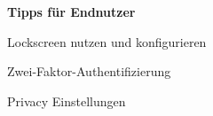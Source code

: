 \begin{frame}
	\centering
	\textbf{Tipps für Endnutzer}
    		\begin{block}{}
				Lockscreen nutzen und konfigurieren
			\end{block}
			\begin{block}{}
				Zwei-Faktor-Authentifizierung
			\end{block}
			\begin{block}{}
				Privacy Einstellungen
			\end{block}
\end{frame}